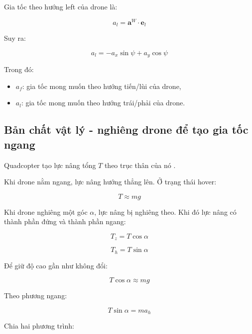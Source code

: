Gia tốc theo hướng left của drone là:

\begin{equation}
    a_l
    =
    \mathbf{a}^{W} \cdot \mathbf{e}_l
\end{equation}

Suy ra:

\begin{equation}
    a_l
    =
    -a_x\sin\psi + a_y\cos\psi
\end{equation}

Trong đó:
\begin{itemize}
    \item $a_f$: gia tốc mong muốn theo hướng tiến/lùi của drone,
    \item $a_l$: gia tốc mong muốn theo hướng trái/phải của drone.
\end{itemize}

\subsection{Bản chất vật lý - nghiêng drone để tạo gia tốc ngang}

Quadcopter tạo lực nâng tổng $T$ theo trục thân của nó \cite{bouabdallah2007design}.

Khi drone nằm ngang, lực nâng hướng thẳng lên.
Ở trạng thái hover:

\begin{equation}
    T \approx mg
\end{equation}

Khi drone nghiêng một góc $\alpha$, lực nâng bị nghiêng theo.
Khi đó lực nâng có thành phần đứng và thành phần ngang:

\begin{equation}
    T_z = T\cos\alpha
\end{equation}

\begin{equation}
    T_h = T\sin\alpha
\end{equation}

Để giữ độ cao gần như không đổi:

\begin{equation}
    T\cos\alpha \approx mg
\end{equation}

Theo phương ngang:

\begin{equation}
    T\sin\alpha = ma_h
\end{equation}

Chia hai phương trình:

